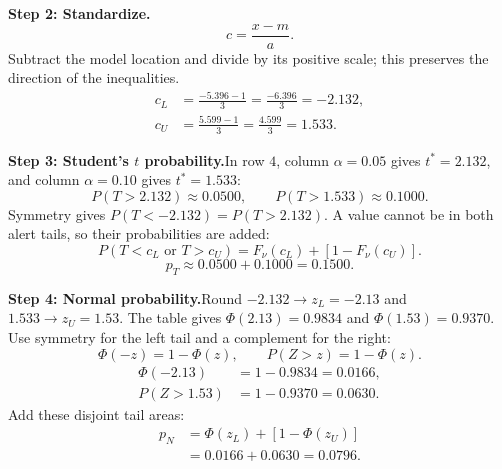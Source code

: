 \begin{enumerate}[leftmargin=*,label=\textbf{\arabic*.},itemsep=12pt,parsep=3pt,topsep=5pt]
\begin{minipage}[t]{\linewidth}
\end{minipage}\par
\par\noindent\begin{minipage}{\linewidth}
\par\textbf{Step 2: Standardize.}\nopagebreak\enspace \[
c=\frac{x-m}{a}.
\]
Subtract the model location and divide by its positive scale; this preserves the direction of the inequalities.
\[
\begin{aligned}c_L&=\frac{-5.396-1}{3}=\frac{-6.396}{3}=-2.132,\\c_U&=\frac{5.599-1}{3}=\frac{4.599}{3}=1.533.\end{aligned}
\]

\end{minipage}\par
\par\noindent\begin{minipage}{\linewidth}
\par\textbf{Step 3: Student's $t$ probability.}\nopagebreak\enspace In row $4$, column $\alpha=0.05$ gives $t^*=2.132$, and column $\alpha=0.10$ gives $t^*=1.533$:
\[
P(T>2.132)\approx0.0500,\qquad P(T>1.533)\approx0.1000.
\]
Symmetry gives $P(T<-2.132)=P(T>2.132)$. A value cannot be in both alert tails, so their probabilities are added:
\[
P(T<c_L\text{ or }T>c_U)=F_\nu(c_L)+[1-F_\nu(c_U)].
\]
\[
p_T\approx0.0500+0.1000=\boxed{0.1500}.
\]

\end{minipage}\par
\par\textbf{Step 4: Normal probability.}\nopagebreak\enspace Round $-2.132\to z_L=-2.13$ and $1.533\to z_U=1.53$. The table gives $\Phi(2.13)=0.9834$ and $\Phi(1.53)=0.9370$. Use symmetry for the left tail and a complement for the right:
\[
\Phi(-z)=1-\Phi(z),\qquad P(Z>z)=1-\Phi(z).
\]
\[
\begin{aligned}\Phi(-2.13)&=1-0.9834=0.0166,\\P(Z>1.53)&=1-0.9370=0.0630.\end{aligned}
\]
Add these disjoint tail areas:
\[
\begin{aligned}p_N&=\Phi(z_L)+[1-\Phi(z_U)]\\&=0.0166+0.0630=\boxed{0.0796}.\end{aligned}
\]


\end{enumerate}
